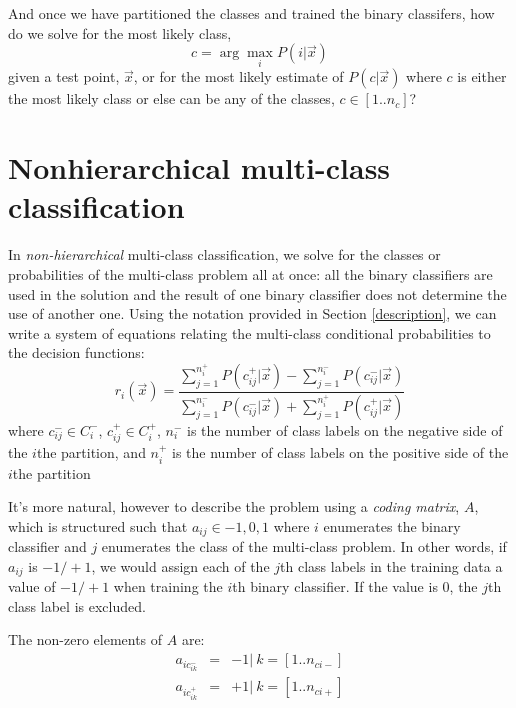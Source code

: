 \documentclass{article}
\begin{document}
And once we have partitioned the classes
and trained the binary classifers, 
how do we solve for the most likely class, 
\begin{equation}
	c=\arg \max_i P(i | \vec x)
\end{equation}
given a test point, $\vec x$,
or for the most likely estimate
of $P(c | \vec x)$ where $c$ is either the most likely class
or else can be any of the classes, $c \in [1..n_c]$?

\section{Nonhierarchical multi-class classification}

In {\it non-hierarchical} multi-class classification, we solve for the
classes or probabilities of the multi-class problem all at once:
all the binary classifiers are used in the solution and the result of
one binary classifier does not determine the use of another one.
Using the notation provided in Section \ref{description}, 
we can write a system of equations relating
the multi-class conditional probabilities to the decision
functions:
\begin{equation}
	r_i(\vec x) = \frac{\sum_{j=1}^{n_i^+} P(c_{ij}^+|\vec x) - \sum_{j=1}^{n_{i}^-} P(c_{ij}^-|\vec x)}{\sum_{j=1}^{n_i^-} P(c_{ij}^-|\vec x) + \sum_{j=1}^{n_i^+} P(c_{ij}^+|\vec x)}
	\label{decision_function}
\end{equation}
where 
$c_{ij}^- \in C_i^-$,
$c_{ij}^+ \in C_i^+$,
$n_i^-$ is the number of class labels on the negative side of
the $i$the partition,
and $n_i^+$ is the number of class labels on the positive side of
the $i$the partition

It's more natural, however to describe the problem using a
{\it coding matrix}, $A$, 
which is structured such that
$a_{ij} \in {-1, 0, 1}$ where $i$ enumerates the binary classifier and
$j$ enumerates the class of the multi-class problem.
In other words, if $a_{ij}$ is $-1/+1$, we would assign each of the $j$th class
labels in the training data a value of $-1/+1$ when training the $i$th
binary classifier. If the value is $0$, the $j$th class label is excluded.

The non-zero elements of $A$ are:
\begin{eqnarray}
	a_{ic_{ik}^-} & = & -1 | ~k = [1..n_{ci-}]\\
a_{ic_{ik}^+} & = & +1 | ~k=[1..n_{ci+}]
\end{eqnarray}
\end{document}
